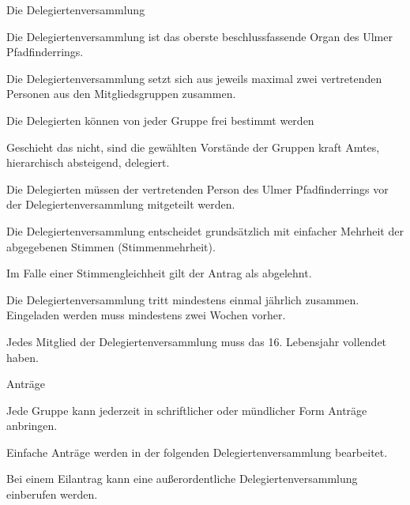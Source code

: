 \begin{legal}
    \newpage
    \item Die Delegiertenversammlung
        \begin{legal}
            \item Die Delegiertenversammlung ist das oberste beschlussfassende Organ
                  des Ulmer Pfadfinderrings.
            \item Die Delegiertenversammlung setzt sich aus jeweils maximal zwei 
                  vertretenden Personen aus den Mitgliedsgruppen zusammen.
                \begin{legal}
                    \item Die Delegierten können von jeder Gruppe frei bestimmt werden 
                    \item Geschieht das nicht, sind die gewählten Vorstände der Gruppen kraft Amtes, 
                          hierarchisch absteigend, delegiert.
                    \item Die Delegierten müssen der vertretenden Person des Ulmer 
                          Pfadfinderrings vor der Delegiertenversammlung mitgeteilt werden.
                \end{legal}
            \item Die Delegiertenversammlung entscheidet grundsätzlich mit einfacher Mehrheit der 
                  abgegebenen Stimmen (Stimmenmehrheit).
            \item Im Falle einer Stimmengleichheit gilt der Antrag als abgelehnt.
            \item Die Delegiertenversammlung tritt mindestens einmal jährlich zusammen.
                  Eingeladen werden muss mindestens zwei Wochen vorher.
            \item Jedes Mitglied der Delegiertenversammlung muss das 16. Lebensjahr vollendet haben.
            \item Anträge
                \begin{legal}
                    \item Jede Gruppe kann jederzeit in schriftlicher oder mündlicher Form Anträge 
                          anbringen.
                    \item Einfache Anträge werden in der folgenden Delegiertenversammlung 
                          bearbeitet.
                \end{legal}
            \item Bei einem Eilantrag kann eine außerordentliche Delegiertenversammlung 
                  einberufen werden.
                  \begin{legal}

\end{legal}
\end{legal}
\end{legal}

